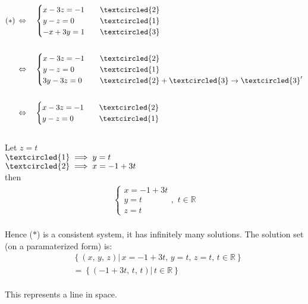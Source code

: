 \documentclass{jhwhw}
\begin{document}
\begin{align*} 
(\ast)\,&\Leftrightarrow \quad \begin{cases} x-3z=-1 & \quad \textcircled{2} \\ y-z=0 & \quad \textcircled{1} \\ -x+3y=1 & \quad \textcircled{3} \end{cases}
\\ \\
&\Leftrightarrow \quad \begin{cases} x-3z=-1 & \quad \textcircled{2} \\ y-z=0 & \quad \textcircled{1} \\ 3y-3z=0 & \quad \textcircled{2}+\textcircled{3} \rightarrow \textcircled{3}' \end{cases}
\\ \\
&\Leftrightarrow \quad \begin{cases} x-3z=-1 & \quad \textcircled{2} \\ y-z=0 & \quad \textcircled{1} \end{cases}
\end{align*}
\\
Let \(z=t\)\\
\(\textcircled{1} \implies y = t\)\\
\(\textcircled{2} \implies x=-1 +3t\)\\
then \begin{align*} 
\begin{cases} x=-1+3t \\ y=t \\ z=t \end{cases} \text{, }\, t \in \mathbb{R} 
\end{align*}
\\
Hence (\(\ast\)) is a consistent system, it has infinitely many solutions. The solution set (on a paramaterized form) is:
\\
\begin{align*} 
    &\left\{(x,\,y,\,z) |\, x=-1+3t,\,y=t,\,z=t,\,t \in \mathbb{R}\right\}\\
    &=\left\{(-1+3t,\,t,\,t) |\,t \in \mathbb{R}  \right\}
\end{align*}
\\
This represents a line in space.
\\ \\
\end{document}
